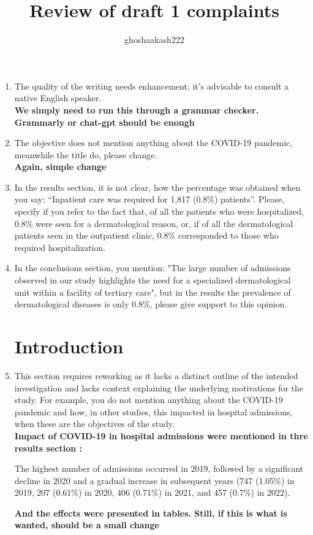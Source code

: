 \documentclass[a4paper]{article}
\title{Review of draft 1 complaints}
\author{ghoshaakash222}
\begin{document}
\maketitle
\begin{enumerate}
    \section{Summary}
    \item The quality of the writing needs enhancement; it's advisable to consult a native English speaker.\\
    \textbf{We simply need to run this through a grammar checker. Grammarly or chat-gpt should be enough}
    \item The objective does not mention anything about the COVID-19 pandemic, meanwhile the title do, please change.\\\textbf{Again, simple change}
    \item  In the results section, it is not clear, how the percentage was obtained when you say: “Inpatient care was required for 1,817 (0.8\%) patients”. Please, specify if you refer to the fact that, of all the patients who were hospitalized, 0.8\% were
    seen for a dermatological reason, or, if of all the dermatological patients seen in the outpatient clinic, 0.8\% corresponded to those who required hospitalization.
    \item  In the conclusions section, you mention: "The large number of admissions observed in our study highlights the need for a specialized dermatological unit within a facility of tertiary care", but in the results the prevalence of dermatological
    diseases is only 0.8\%, please give support to this opinion.

    \section{Introduction }
    \item This section requires reworking as it lacks a distinct outline of the intended investigation and lacks context explaining the underlying motivations for the study. For example, you do not mention anything about the COVID-19 pandemic and how, in other studies, this impacted in hospital admissions, when these are the objectives of the study.\\
    \textbf{Impact of COVID-19 in hospital admissions were mentioned in thre results section :}
    \begin{displayquote}
        The highest number of admissions occurred in 2019, followed by a significant decline in 2020 and a gradual increase in subsequent years (747 (1.05\%) in 2019, 207 (0.61\%) in 2020, 406 (0.71\%) in 2021, and 457 (0.7\%) in 2022).
    \end{displayquote}
    \textbf{And the effects were presented in tables. Still, if this is what is wanted, should be a small change}

\end{enumerate}
\end{document}
